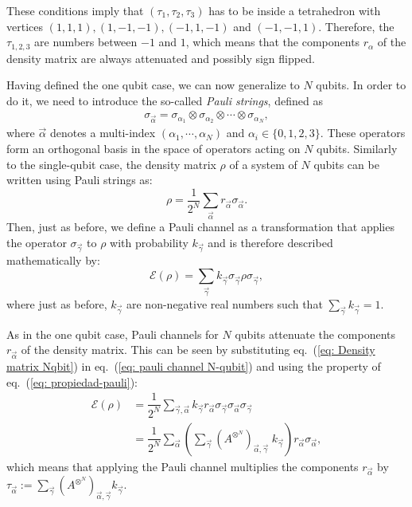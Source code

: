 \documentclass[10pt,letterpaper]{article} %
\newcommand{\eref}[1]{eq.~(\ref{#1})}
\begin{document}
These conditions imply that $(\tau_1,\tau_2,\tau_3)$
has to be inside a tetrahedron with
vertices $(1,1,1), (1,-1,-1),(-1,1,-1)$ and $(-1,-1,1)$. 
Therefore, the $\tau_{1,2,3}$ are numbers between 
$-1$ and $1$, which means that the components
$r_{\alpha}$ of the density matrix are always 
attenuated and possibly sign flipped.

Having defined the one qubit case,  we can now generalize to $N$ qubits.
In order to do it, we need to introduce the so-called \textit{Pauli strings}, defined as
\begin{eqnarray}
\label{eq: Pauli string}
\sigma_{\vec{\alpha}} = \sigma_{\alpha_1} \otimes \sigma_{\alpha_2}\otimes \cdots \otimes \sigma_{\alpha_N},
\end{eqnarray}
where $\vec{\alpha}$ denotes a multi-index $(\alpha_1, \cdots, \alpha_N)$
 and $\alpha_i \in \{0,1,2,3\}$. 
These operators form an orthogonal basis in the space of operators acting on $N$ qubits. 
 Similarly to the single-qubit case, the density matrix $\rho$ 
of a system of $N$ qubits can be written using Pauli strings as:
\begin{equation}
\label{eq:  Density matrix Nqbit}
\rho = \dfrac{1}{2^N} \sum_{\vec{\alpha}} r_{\vec{\alpha}} \sigma_{\vec{\alpha}}.
\end{equation}
Then, just as before, we define a Pauli channel as a transformation that applies 
the operator $\sigma_{\vec{\gamma}}$ to $\rho$ with probability $k_{\vec{\gamma}}$
and is therefore described mathematically by:
\begin{equation}
\label{eq: pauli channel N-qubit}
\mathcal{E}(\rho) = \sum_{\vec{\gamma}} k_{\vec{\gamma}} \sigma_{\vec{\gamma}} \rho \sigma_{\vec{\gamma}},
\end{equation}
where just as before, $k_{\vec{\gamma}}$ are non-negative real numbers such 
that $\sum_{\vec{\gamma}} k_{\vec{\gamma}}=1$.

As in the one qubit case, Pauli channels for $N$ qubits 
attenuate the components $r_{\vec{\alpha}}$ of the density matrix.
This can be seen by substituting \eref{eq:  Density matrix Nqbit} in \eref{eq: pauli channel N-qubit}
and using the property of \eref{eq: propiedad-pauli}:
\begin{align*}
\mathcal{E}(\rho) &= \dfrac{1}{2^N} \sum_{\vec{\gamma},\vec{\alpha}} k_{\vec{\gamma}} r_{\vec{\alpha}} \sigma_{\vec{\gamma}} \sigma_{\vec{\alpha}} \sigma_{\vec{\gamma}} \\
& = \dfrac{1}{2^N} \sum_{\vec{\alpha}} \left( \sum_{\vec{\gamma}} (A^{\otimes^N})_{\vec{\alpha},\vec{\gamma}} \; k_{\vec{\gamma}} \right) r_{\vec{\alpha}} \sigma_{\vec{\alpha}},
\end{align*}
which means that applying the Pauli channel multiplies the 
components $r_{\vec{\alpha}}$ by $\tau_{\vec{\alpha}} := \sum_{\vec{\gamma}} (A^{\otimes^N})_{\vec{\alpha},\vec{\gamma}} k_{\vec{\gamma}}$.
\end{document}
